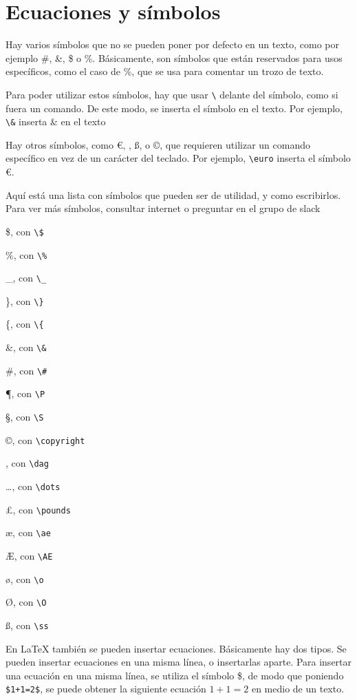 \chapter{Ecuaciones y símbolos}

Hay varios símbolos que no se pueden poner por defecto en un texto, como por ejemplo \#, \&, \$ o \%. Básicamente, son símbolos que están reservados para usos específicos, como el caso de \%, que se usa para comentar un trozo de texto.

Para poder utilizar estos símbolos, hay que usar \verb!\! delante del símbolo, como si fuera un comando. De este modo, se inserta el símbolo en el texto. Por ejemplo, \verb!\&! inserta \& en el texto

Hay otros símbolos, como \euro, \dag, \ss, o \copyright, que requieren utilizar un comando específico en vez de un carácter del teclado. Por ejemplo, \verb!\euro! inserta el símbolo \euro.

Aquí está una lista con símbolos que pueden ser de utilidad, y como escribirlos. Para ver más símbolos, consultar internet o preguntar en el grupo de slack

\$, con \verb!\$!

\%, con \verb!\%!

\_, con \verb!\_!

\}, con \verb!\}!

\{, con \verb!\{!

\&, con \verb!\&!

\#, con \verb!\#!

\P, con \verb!\P!

\S, con \verb!\S!

\copyright, con \verb!\copyright!

\dag, con \verb!\dag!

\dots, con \verb!\dots!

\pounds, con \verb!\pounds!

\ae, con \verb!\ae!

\AE, con \verb!\AE!

\o, con \verb!\o!

\O, con \verb!\O!

\ss, con \verb!\ss!

En LaTeX también se pueden insertar ecuaciones. Básicamente hay dos tipos. Se pueden insertar ecuaciones en una misma línea, o insertarlas aparte. Para insertar una ecuación en una misma línea, se utiliza el símbolo \$, de modo que poniendo \verb!$1+1=2$!, se puede obtener la siguiente ecuación $1+1=2$ en medio de un texto.

